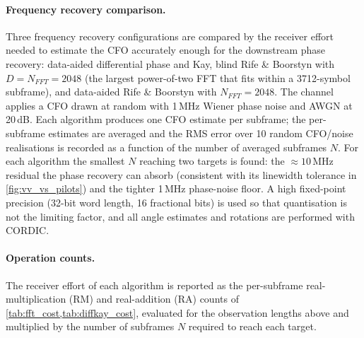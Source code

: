 \documentclass[12pt,a4paper]{report}
\begin{document}
\paragraph{Frequency recovery comparison.} Three frequency recovery configurations are compared by the receiver effort needed to estimate the CFO accurately enough for the downstream phase recovery: data-aided differential phase and Kay, blind Rife \& Boorstyn with \(D = N_{FFT} = 2048\) (the largest power-of-two FFT that fits within a 3712-symbol subframe), and data-aided Rife \& Boorstyn with \(N_{FFT} = 2048\). The channel applies a CFO drawn at random with 1\,MHz Wiener phase noise and AWGN at 20\,dB. Each algorithm produces one CFO estimate per subframe; the per-subframe estimates are averaged and the RMS error over 10 random CFO/noise realisations is recorded as a function of the number of averaged subframes \(N\). For each algorithm the smallest \(N\) reaching two targets is found: the \(\approx 10\)\,MHz residual the phase recovery can absorb (consistent with its linewidth tolerance in \cref{fig:vv_vs_pilots}) and the tighter 1\,MHz phase-noise floor. A high fixed-point precision (32-bit word length, 16 fractional bits) is used so that quantisation is not the limiting factor, and all angle estimates and rotations are performed with CORDIC.

\paragraph{Operation counts.} The receiver effort of each algorithm is reported as the per-subframe real-multiplication (RM) and real-addition (RA) counts of \cref{tab:fft_cost,tab:diffkay_cost}, evaluated for the observation lengths above and multiplied by the number of subframes \(N\) required to reach each target.
\end{document}
